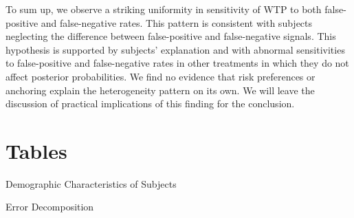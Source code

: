 \documentclass[12pt,a4paper]{article}
\begin{document}
To sum up, we observe a striking uniformity in sensitivity of WTP to both false-positive and false-negative rates. This pattern is consistent with subjects neglecting the difference between false-positive and false-negative signals. This hypothesis is supported by subjects' explanation and with abnormal sensitivities to false-positive and false-negative rates in other treatments in which they do not affect posterior probabilities. We find no evidence that risk preferences or anchoring explain the heterogeneity pattern on its own. We will leave the discussion of practical implications of this finding for the conclusion.



 

\vspace{20pt}



\clearpage





\appendix

\newpage
\section{Tables}


\begin{table}[h!]
\caption{Demographic Characteristics of Subjects} \label{summ_tab}

\end{table}

\begin{table}[h!]
\caption{Error Decomposition} \label{belief_decomposition}

\end{table}

 \label{ip_tab}

 \label{wtp_dem}

 \label{wtp_risk}
%
%
%
\end{document}
